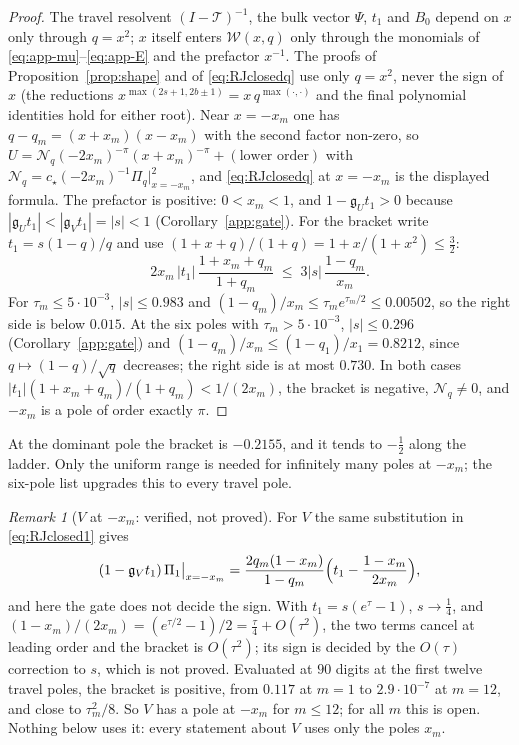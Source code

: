 \documentclass[11pt]{article}
\theoremstyle{plain}
\theoremstyle{definition}
\theoremstyle{remark}
\newtheorem{remark}[theorem]{Remark}
\begin{document}
\begin{proof}
The travel resolvent $(I-\mathcal T)^{-1}$, the bulk vector $\Psi$, $t_1$ and $B_0$ depend on $x$
only through $q=x^2$; $x$ itself enters $\mathcal W(x,q)$ only through the monomials of
\eqref{eq:app-mu}--\eqref{eq:app-E} and the prefactor $x^{-1}$. The proofs of
Proposition~\ref{prop:shape} and of \eqref{eq:RJclosedq} use only $q=x^2$, never the sign of $x$
(the reductions $x^{\max(2s+1,2b\pm1)}=x\,q^{\max(\cdot,\cdot)}$ and the final polynomial identities
hold for either root). Near $x=-x_m$ one has $q-q_m=(x+x_m)(x-x_m)$ with the second factor
non-zero, so $U=\mathcal N_q(-2x_m)^{-\pi}(x+x_m)^{-\pi}+(\text{lower order})$ with
$\mathcal N_q=c_\star(-2x_m)^{-1}\Pi_q|_{x=-x_m}^2$, and \eqref{eq:RJclosedq} at $x=-x_m$ is the
displayed formula. The prefactor is positive: $0<x_m<1$, and $1-\mathfrak g_Ut_1>0$ because
$|\mathfrak g_Ut_1|<|\mathfrak g_Vt_1|=|s|<1$ (Corollary~\ref{app:gate}). For the bracket write
$t_1=s(1-q)/q$ and use $(1+x+q)/(1+q)=1+x/(1+x^2)\le\tfrac32$:
\[
   2x_m\,|t_1|\,\frac{1+x_m+q_m}{1+q_m}\;\le\;3|s|\,\frac{1-q_m}{x_m}.
\]
For $\tau_m\le5\cdot10^{-3}$, $|s|\le0.983$ and $(1-q_m)/x_m\le\tau_me^{\tau_m/2}\le0.00502$, so the
right side is below $0.015$. At the six poles with $\tau_m>5\cdot10^{-3}$, $|s|\le0.296$
(Corollary~\ref{app:gate}) and $(1-q_m)/x_m\le(1-q_1)/x_1=0.8212$, since $q\mapsto(1-q)/\sqrt q$
decreases; the right side is at most $0.730$. In both cases $|t_1|(1+x_m+q_m)/(1+q_m)<1/(2x_m)$, the
bracket is negative, $\mathcal N_q\ne0$, and $-x_m$ is a pole of order exactly $\pi$.
\end{proof}

\noindent At the dominant pole the bracket is $-0.2155$, and it tends to $-\tfrac12$ along the
ladder. Only the uniform range is needed for infinitely many poles at $-x_m$; the six-pole list
upgrades this to every travel pole.

\begin{remark}[$V$ at $-x_m$: verified, not proved]\label{rem:Vminusx}
For $V$ the same substitution in \eqref{eq:RJclosed1} gives
\[
   (1-\mathfrak g_Vt_1)\,\Pi_1\big|_{x=-x_m}=\frac{2q_m(1-x_m)}{1-q_m}\Bigl(t_1-\frac{1-x_m}{2x_m}\Bigr),
\]
and here the gate does not decide the sign. With $t_1=s(e^{\tau}-1)$, $s\to\tfrac14$, and
$(1-x_m)/(2x_m)=(e^{\tau/2}-1)/2=\tfrac\tau4+O(\tau^2)$, the two terms cancel at leading order and
the bracket is $O(\tau^2)$; its sign is decided by the $O(\tau)$ correction to $s$, which is not
proved. Evaluated at $90$ digits at the first twelve travel poles, the bracket is positive, from
$0.117$ at $m=1$ to $2.9\cdot10^{-7}$ at $m=12$, and close to $\tau_m^2/8$. So $V$ has a pole at
$-x_m$ for $m\le12$; for all $m$ this is open. Nothing below uses it: every statement about $V$ uses
only the poles $x_m$.
\end{remark}
\end{document}
